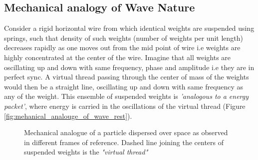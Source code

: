 \documentclass[11pt, a4paper]{article}
\begin{document}
\subsection{Mechanical analogy of Wave Nature \cite{de_broglie_thesis}}\label{sec:mechanical_analogy_to_wave_nature}
Consider a rigid horizontal wire from which identical weights are suspended using springs, such that density of such weights (number of weights per unit length) decreases rapidly as one moves out from the mid point of wire i.e weights are highly concentrated at the center of the wire. Imagine that all weights are oscillating up and down with same frequency, phase and amplitude i.e they are in perfect sync. A virtual thread passing through the center of mass of the weights would then be a straight line, oscillating up and down with same frequency as any of the weight. This ensemble of suspended weights is \textit{'analogous to a energy packet'}, where energy is carried in the oscillations of the virtual thread (Figure \ref{fig:mehanical_analouge_of_wave_rest}).
\begin{figure}
	\centering



	\caption{Mechanical analogue of a particle dispersed over space as observed in different frames of reference. Dashed line joining the centers of suspended weights is the \textit{"virtual thread"}}
	\label{fig:mehanical_analouge_of_wave}
\end{figure}
\end{document}
